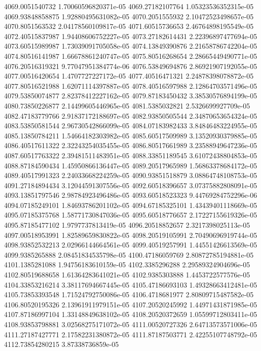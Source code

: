 {4069.0051540732 1.70060596820371e-05
4069.27182107764 1.05323536352315e-05
4069.93848858875 1.92880495631082e-05
4070.2051555932 2.10472523498657e-05
4070.8051563532 2.04178560109817e-05
4071.60515736653 2.46764898195549e-05
4072.40515837987 1.94408606752227e-05
4073.27182614431 2.22396897477694e-05
4073.60515989987 1.73039091705058e-05
4074.13849390876 2.21658786742204e-05
4074.80516141987 1.66678861240747e-05
4075.80516268654 2.28665449490771e-05
4076.20516319321 9.77047951384774e-06
4076.53849694876 2.86921907192055e-05
4077.00516420654 1.4707727227172e-05
4077.40516471321 2.24878398078872e-05
4077.80516521988 1.62071114397887e-05
4078.40516597988 2.12864703571496e-05
4079.53850074877 2.82378412227162e-05
4079.87183450432 3.38530576894199e-05
4080.73850226877 2.14499605446965e-05
4081.5385032821 2.5326699927709e-05
4082.47183779766 2.91837172188697e-05
4082.93850505544 2.34870653654324e-05
4083.53850581544 2.96730542866099e-05
4084.07183982433 3.84846483224955e-05
4085.13850784211 1.54664182303982e-05
4085.60517509989 3.13520930379885e-05
4086.40517611322 2.32243254035455e-05
4086.80517661989 3.23588949647236e-05
4087.60517763322 2.39481511483951e-05
4088.33851189545 3.61072438804853e-05
4088.87184590434 1.45950866136447e-05
4089.20517965989 1.56863378684172e-05
4089.40517991323 2.24033668224259e-05
4090.93851518879 3.08864748108753e-05
4091.27184894434 3.12044591307556e-05
4092.60518396657 3.07375882808091e-05
4093.13851797546 2.98784923496486e-05
4093.60518523323 9.44769284752296e-06
4094.07185249101 1.84693786201102e-05
4094.67185325101 1.43439401118669e-05
4095.07185375768 1.58771730847036e-05
4095.60518776657 2.17227155619326e-05
4095.87185477102 1.9797737813419e-05
4096.20518852657 2.3217398025113e-05
4097.00518953991 1.82589659830822e-05
4098.20519105991 2.70490696919744e-05
4098.93852532213 2.02966144664561e-05
4099.40519257991 1.44551426613569e-05
4099.9385265888 2.08451834535798e-05
4100.47186059769 2.80872785194881e-05
4101.1385281088 1.94756183610159e-05
4102.3385296288 2.29589324904696e-05
4102.80519688658 1.61364283641021e-05
4102.9385303888 1.4453722577576e-05
4104.33853216214 3.38117694667445e-05
4105.47186693103 1.49328663412481e-05
4105.73853393548 1.71524792750086e-05
4106.4718681977 2.80809715487582e-05
4106.80520195326 2.13961911979151e-05
4107.20520245992 1.44971431871985e-05
4107.87186997104 1.33148849638102e-05
4108.20520372659 1.05599712803411e-05
4108.93853798881 3.02568275171072e-05
4111.00520727326 2.64713573571006e-05
4111.27187427771 2.17582231380872e-05
4111.87187503771 2.42255107748792e-05
4112.73854280215 3.87338736859e-05
}
